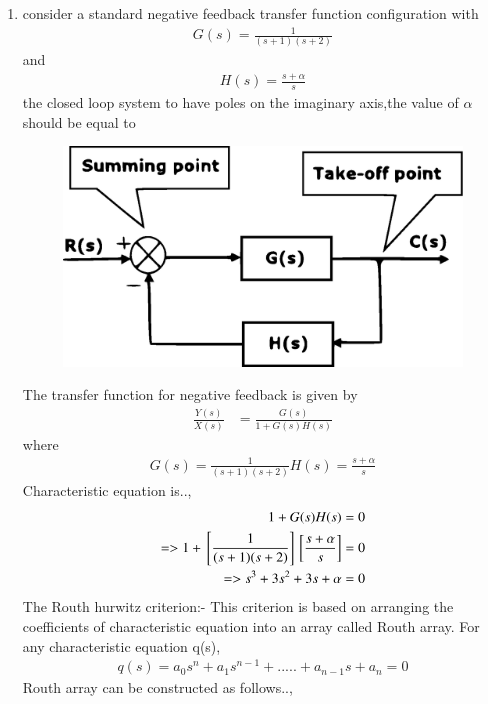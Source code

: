 \begin{enumerate}[label=\thesection.\arabic*.,ref=\thesection.\theenumi]

\item
consider a standard negative feedback transfer function configuration with
\begin{align}
G(s) = \frac{1}{(s+1)(s+2)}
\end{align}
and
\begin{align}
H(s) = \frac{s+\alpha}{s}
\end{align}
the closed loop system to have poles on the imaginary axis,the value of $\alpha$ should be equal to
\begin{figure}[!ht]
\centering
\includegraphics[width=\columnwidth]{./fig/ee18btech11020_basic_block_diagram.eps}
\caption{}
\label{fig:sec_order}
\end{figure}
\solution The transfer function for negative feedback is given by
\begin{align}
\frac{Y(s)}{X(s)} &= \frac{G(s)}{1+G(s)H(s)}
\end{align}
where 
\begin{align}
G(s) = \frac{1}{(s+1)(s+2)}
H(s) = \frac{s+\alpha}{s}
\end{align}
Characteristic equation is..,
\begin{align}
 1 + G(s)H(s) = 0
\\
=> 1 + {}\left[\frac{1}{(s+1)(s+2)}\right]{}\left[\frac{s+\alpha}{s}\right] = 0
\\
=> s^3+3s^2+3s+\alpha = 0
\end{align}
The Routh hurwitz criterion:-
This criterion is based on arranging the coefficients of characteristic equation into an array called Routh array.
For any characteristic equation q(s),
\begin{multline}
q(s) = a_0s^n+a_1s^{n-1}+.....+a_{n-1}s+a_n = 0
\end{multline}
Routh array can be constructed as follows..,
 

\end{enumerate}
